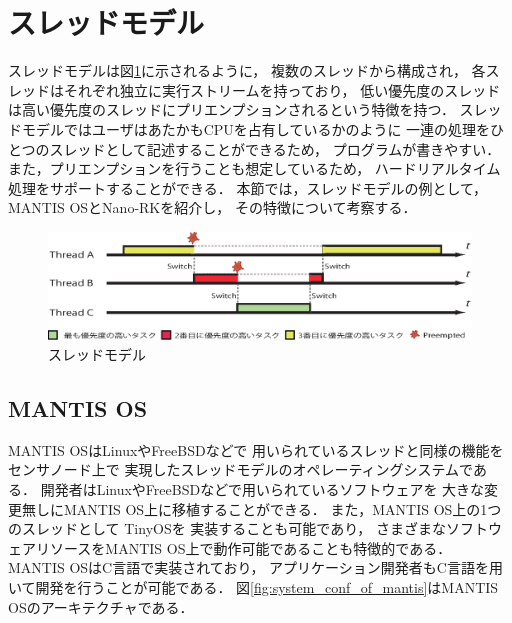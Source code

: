 \section{スレッドモデル}\label{sec:threads_model}
スレッドモデルは図\ref{fig:threads_model}に示されるように，
複数のスレッドから構成され，
各スレッドはそれぞれ独立に実行ストリームを持っており，
低い優先度のスレッドは高い優先度のスレッドにプリエンプションされるという特徴を持つ．
スレッドモデルではユーザはあたかもCPUを占有しているかのように
一連の処理をひとつのスレッドとして記述することができるため，
プログラムが書きやすい．
また，プリエンプションを行うことも想定しているため，
ハードリアルタイム処理をサポートすることができる．
本節では，スレッドモデルの例として，
MANTIS OSとNano-RKを紹介し，
その特徴について考察する．



\begin{figure}[htbp]
 \begin{center}
  \includegraphics[width=140mm]{./images/threads_model.eps}
 \end{center}
 \caption{スレッドモデル}
 \label{fig:threads_model}
\end{figure}



\subsection{MANTIS OS}
MANTIS OS\cite{Bhatti:2005:MOE:1160162.1160178}はLinuxやFreeBSDなどで
用いられているスレッドと同様の機能をセンサノード上で
実現したスレッドモデルのオペレーティングシステムである．
開発者はLinuxやFreeBSDなどで用いられているソフトウェアを
大きな変更無しにMANTIS OS上に移植することができる．
また，MANTIS OS上の1つのスレッドとして
TinyOS\cite{Hill:2000:SAD:356989.356998}\cite{Levis04tinyos:an}を
実装することも可能であり\cite{Trumpler06asystematic}，
さまざまなソフトウェアリソースをMANTIS OS上で動作可能であることも特徴的である．
MANTIS OSはC言語で実装されており，
アプリケーション開発者もC言語を用いて開発を行うことが可能である．
図\ref{fig:system_conf_of_mantis}はMANTIS OSのアーキテクチャである．

